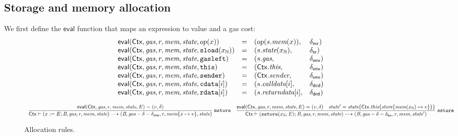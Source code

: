 \def\eval{\mathsf{eval}}
\subsection{Storage and memory allocation}
We first define the $\eval$ function that maps an expression to value and a gas cost:
$$
\begin{array}{llll}
    \eval(\ctx, \textit{gas},r,\memory,\state, op(x)) &=& 
    (op(s.\memory(x)),&\dmr) \\
    \eval(\ctx, \textit{gas},r,\memory,\state, \sload{x_\Nat}) &=& (s.\state(x_\Nat),&\dsr)\\
    \eval(\ctx, \textit{gas}, r,\memory,\state, \mathtt{gasleft}) &=& (s.\textit{gas},&\denv) \\
    \eval(\ctx,\textit{gas}, r,\memory,\state,\mathtt{this}) &=& (\ctx.\thisVal,&\denv) \\
    \eval(\ctx, \textit{gas}, r,\memory,\state, \mathtt{sender}) &=& (\ctx.\senderVal,&\denv) \\
    \eval(\ctx, \textit{gas}, r,\memory,\state,\bcd[i]) &=& (s.\callDataVal[i],&\dcd) \\
    \eval(\ctx, \textit{gas}, r,\memory,\state,\brd[i]) &=& (s.\returnDataVal[i],&\drd)
\end{array}
$$
\begin{figure}[ht]
$$
\begin{array}{c}
\dfrac{
\eval(\ctx,\textit{gas}, r,\memory,\state,E) = (v,\delta) 
}
{
\ctx\vdash 
(x:=E;\bytecode,\textit{gas}, r, \memory,\state) 
\rar 
(\bytecode,\textit{gas}-\delta-\delta_\mathsf{mw}, r,\memory\set{x\mapsto v},\state)
}\rlab{mstore}
\end{array}

\\\\
\begin{array}{c}
\dfrac{
\eval(\ctx,\textit{gas}, r,\memory,\state,E) = (v,\delta)
\quad
\state' = \state\set{\ctx.\thisVal\set{\store\set{\memory(x_\Nat)\mapsto v}}}
}
{
\ctx\vdash 
(\sstore{x_\Nat,E};\bytecode,\textit{gas}, r, \memory,\state) 
\rar 
(\bytecode,\textit{gas}-\delta-\delta_\mathsf{sw}, r,\memory,\state')
}\rlab{sstore}
\end{array}
$$
\caption{Allocation rules.}
\end{figure}
